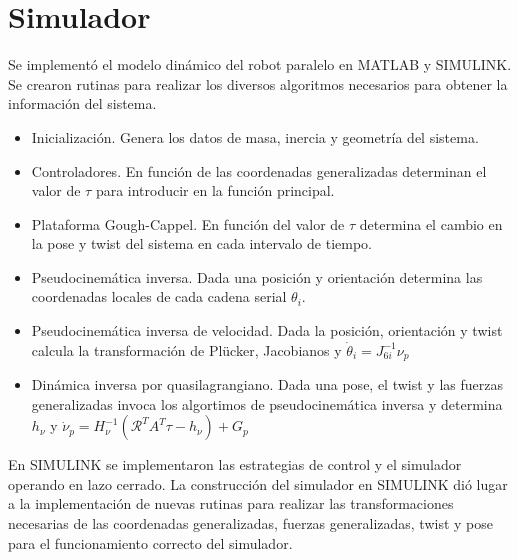 \section{Simulador}

Se implementó el modelo dinámico del robot paralelo en MATLAB y SIMULINK.
Se crearon rutinas para realizar los diversos algoritmos necesarios para obtener la información del sistema.
\begin{itemize}
    \item Inicialización. Genera los datos de masa, inercia y geometría del sistema.
    \item Controladores. En función de las coordenadas generalizadas determinan el valor de $\tau$ para introducir en la función principal.
    \item Plataforma Gough-Cappel. En función del valor de $\tau$ determina el cambio en la pose y twist del sistema en cada intervalo de tiempo.
    \item Pseudocinemática inversa. Dada una posición y orientación determina las coordenadas locales de cada cadena serial $\theta_i$.
    \item Pseudocinemática inversa de velocidad. Dada la posición, orientación y twist calcula la transformación de Plücker, Jacobianos y $\dot \theta_i = J_{6i}^{-1}\nu_p$
    \item Dinámica inversa por quasilagrangiano. Dada una pose, el twist y las fuerzas generalizadas invoca los algortimos de pseudocinemática inversa y determina $h_\nu$ y $\dot \nu_p = H_\nu^{-1}(\mathcal{R}^T A^T \tau - h_\nu)+G_p$
\end{itemize}

En SIMULINK se implementaron las estrategias de control y el simulador operando en lazo cerrado. 
La construcción del simulador en SIMULINK dió lugar a la implementación de nuevas rutinas para realizar las transformaciones necesarias de las coordenadas generalizadas, fuerzas generalizadas, twist y pose para el funcionamiento correcto del simulador.

